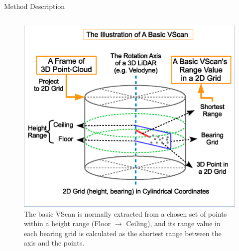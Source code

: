 \documentclass[final,hyperref={pdfpagelabels=false}]{beamer}
\begin{document}
\begin{frame}[t]
\begin{columns}[t]
\begin{column}{0.47\textwidth}

\begin{block}{Method Description}

\begin{columns}
	\begin{column}{0.46\textwidth}
		\begin{figure}
			\centering
			\includegraphics[width=\textwidth]{grid}
			\caption{The basic VScan is normally extracted from a chosen set of points within a height range (Floor $\rightarrow$ Ceiling), and its range value in each bearing grid is calculated as the shortest range between the axis and the points.}
		\end{figure}
	\end{column}
	

\end{columns}
\end{block}
\end{column}
\end{columns}
\end{frame}
\end{document}
